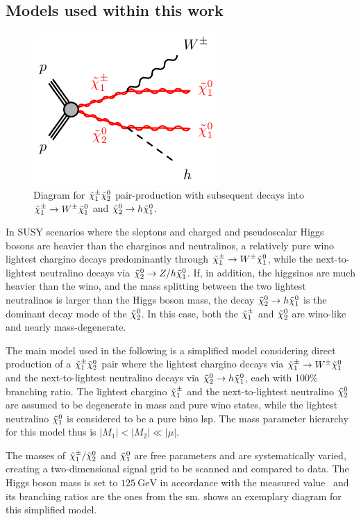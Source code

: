 \subsection{Models used within this work}\label{sec:models_used}

\begin{figure}
	\centering\includegraphics[width=.4\textwidth]{C1N2-WhN1N1}
	\caption{Diagram for $\tilde{\chi}_1^\pm\tilde{\chi}_2^0$ pair-production with subsequent decays into $\tilde{\chi}_1^\pm\rightarrow W^\pm\tilde{\chi}_1^0$ and $\tilde{\chi}_2^0\rightarrow h\tilde{\chi}_1^0$.}\label{fig:Wh_model}
\end{figure}

In SUSY scenarios where the sleptons and charged and pseudoscalar Higgs bosons are heavier than the charginos and neutralinos, a relatively pure wino lightest chargino decays predominantly through $\tilde{\chi}_1^\pm\rightarrow W^\pm\tilde{\chi}_1^0$, while the next-to-lightest neutralino decays via $\tilde{\chi}_2^0\rightarrow Z/h\tilde{\chi}_1^0$. If, in addition, the higgsinos are much heavier than the wino, and the mass splitting between the two lightest neutralinos is larger than the Higgs boson mass, the decay $\tilde{\chi}_2^0\rightarrow h\tilde{\chi}_1^0$ is the dominant decay mode of the $\tilde{\chi}_2^0$. In this case, both the $\tilde{\chi}_1^\pm$ and $\tilde{\chi}_2^0$ are wino-like and nearly mass-degenerate.

The main model used in the following is a simplified model considering direct production of a $\tilde{\chi}_1^\pm\tilde{\chi}_2^0$ pair where the lightest chargino decays via $\tilde{\chi}_1^\pm\rightarrow W^\pm\tilde{\chi}_1^0$ and the next-to-lightest neutralino decays via $\tilde{\chi}_2^0\rightarrow h\tilde{\chi}_1^0$, each with 100\% branching ratio. The lightest chargino $\tilde{\chi}_1^\pm$ and the next-to-lightest neutralino $\tilde{\chi}_2^0$ are assumed to be degenerate in mass and pure wino states, while the lightest neutralino $\tilde{\chi}_1^0$ is considered to be a pure bino \gls{lsp}. The mass parameter hierarchy for this model thus is $\vert M_1 \vert < \vert M_2 \vert \ll \vert\mu\vert$. 


The masses of $\tilde{\chi}_1^\pm/\tilde{\chi}_2^0$ and $\tilde{\chi}_1^0$ are free parameters and are systematically varied, creating a two-dimensional signal grid to be scanned and compared to data. The Higgs boson mass is set to $\SI{125}{\GeV}$ in accordance with the measured value~\cite{Aad:2012tfa,Chatrchyan:2012ufa} and its branching ratios are the ones from the \gls{sm}.  shows an exemplary diagram for this simplified model.

